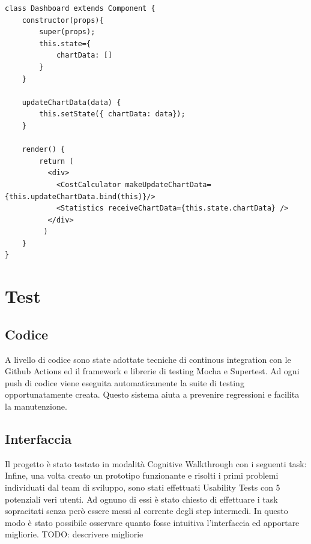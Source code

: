 \documentclass{report}
\begin{document}
\begin{lstlisting}
class Dashboard extends Component {
	constructor(props){
		super(props);
		this.state={
			chartData: []
		}
	}

	updateChartData(data) {
		this.setState({ chartData: data});
	}

	render() {
		return (
		  <div>
		    <CostCalculator makeUpdateChartData= {this.updateChartData.bind(this)}/>
		    <Statistics receiveChartData={this.state.chartData} />
		  </div>
		 )
	}
}
\end{lstlisting}

\section{Test}
\subsection{Codice}
A livello di codice sono state adottate tecniche di continous integration con le Github Actions ed il framework e librerie di testing
Mocha e Supertest.
Ad ogni push di codice viene eseguita automaticamente la suite di testing opportunatamente creata.
Questo sistema aiuta a prevenire regressioni e facilita la manutenzione.
\subsection{Interfaccia}
Il progetto è stato testato in modalità Cognitive Walkthrough con i seguenti task:
Infine, una volta creato un prototipo funzionante e risolti i primi problemi individuati dal team di sviluppo,
sono stati effettuati Usability Tests con 5 potenziali veri utenti. Ad ognuno di essi è stato chiesto di effettuare i task
sopracitati senza però essere messi al corrente degli step intermedi. In questo modo è stato possibile osservare quanto fosse
intuitiva l'interfaccia ed apportare migliorie.
TODO: descrivere migliorie
\end{document}
